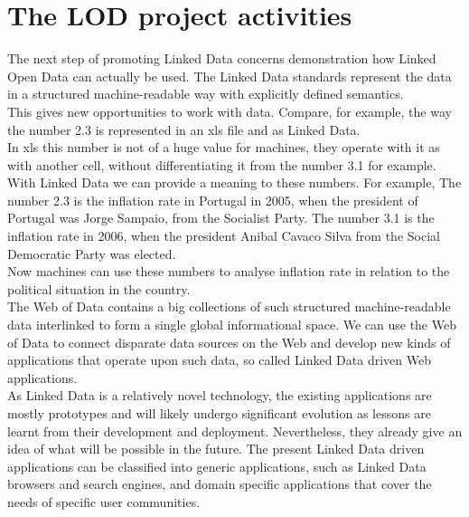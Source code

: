 \documentclass[a4paper,12pt,oneside]{report}
\begin{document}
{{{\section{The LOD project activities}
{The next step of promoting Linked Data concerns demonstration how Linked Open Data can actually be used. The Linked Data standards represent the data in a structured machine-readable way with explicitly defined semantics.\\
 This gives new opportunities to work with data. Compare, for example, the way the number 2.3 is represented in an xls file and as Linked Data. \\
In xls this number is not of a huge value for machines, they operate with it as with another cell, without differentiating it from the number 3.1 for example. With Linked Data we can provide a meaning to these numbers. For example, The number 2.3 is the inflation rate in Portugal in 2005, when the president of Portugal was Jorge Sampaio, from the Socialist Party. The number 3.1 is the inflation rate in 2006, when the president Anibal Cavaco Silva from the Social Democratic Party was elected.\\
 Now machines can use these numbers to analyse inflation rate in relation to the political situation in the country. \\
The Web of Data contains a big collections of such structured machine-readable data interlinked to form a single global informational space. We can use the Web of Data to connect disparate data sources on the Web and develop new kinds of applications that operate upon such data, so called Linked Data driven Web applications.\\
 As Linked Data is a relatively novel technology, the existing applications are mostly prototypes and will likely undergo significant evolution as lessons are learnt from their development and deployment. Nevertheless, they already give an idea of what will be possible in the future. The present Linked Data driven applications can be classified into generic applications, such as Linked Data browsers and search engines, and domain specific applications that cover the needs of specific user communities.}
}}}
\end{document}
